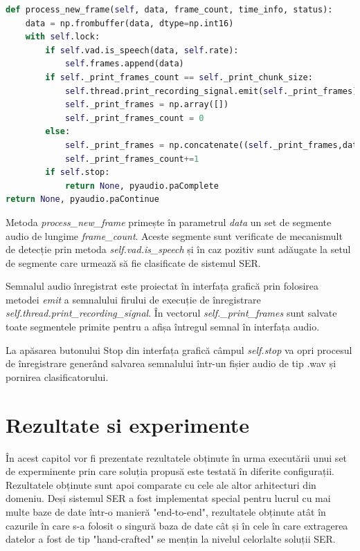 \documentclass[a4paper,12pt]{book}
\begin{document}
\begin{lstlisting}[language=Python, caption={Procesarea unui nou segmente al semnalului audio inregistrat. Daca segmentul nu contine discurs uman este exclus din inregistrarea finala.}]		
def process_new_frame(self, data, frame_count, time_info, status):
	data = np.frombuffer(data, dtype=np.int16)
	with self.lock:
		if self.vad.is_speech(data, self.rate):
			self.frames.append(data)
		if self._print_frames_count == self._print_chunk_size:
			self.thread.print_recording_signal.emit(self._print_frames)
			self._print_frames = np.array([])
			self._print_frames_count = 0
		else:
			self._print_frames = np.concatenate((self._print_frames,data), axis=0)
			self._print_frames_count+=1
		if self.stop:
			return None, pyaudio.paComplete
return None, pyaudio.paContinue	\end{lstlisting}
		Metoda \textit{process\_new\_frame} primește în parametrul \textit{data} un set de segmente audio de lungime \textit{frame\_count}. Aceste segmente sunt verificate de mecanismult de detecție prin metoda \textit{self.vad.is\_speech} și în caz pozitiv sunt adăugate la setul de segmente care urmează să fie clasificate de sistemul SER. \par Semnalul audio înregistrat este proiectat în interfața grafică prin folosirea metodei \textit{emit} a semnalului firului de execuție de înregistrare \textit{self.thread.print\_recording\_signal}. În vectorul \textit{self.\_print\_frames} sunt salvate toate segmentele primite pentru a afișa întregul semnal în interfața audio. \par La apăsarea butonului Stop din interfața grafică câmpul \textit{self.stop} va opri procesul de înregistrare generând salvarea semnalului într-un fișier audio de tip .wav și pornirea clasificatorului.
		
		 
		\chapter{Rezultate si experimente} \label{rezultate}
		 
		 În acest capitol vor fi prezentate rezultatele obținute în urma executării unui set de experminente prin care soluția propusă este testată în diferite configurații. Rezultatele obținute sunt apoi comparate cu cele ale altor arhitecturi din domeniu. Deși sistemul SER a fost implementat special pentru lucrul cu mai multe baze de date într-o manieră "end-to-end", rezultatele obținute atât în cazurile în care s-a folosit o singură baza de date cât și în cele în care extragerea datelor a fost de tip "hand-crafted" se mențin la nivelul celorlalte soluții SER.\par
		 
\end{document}
